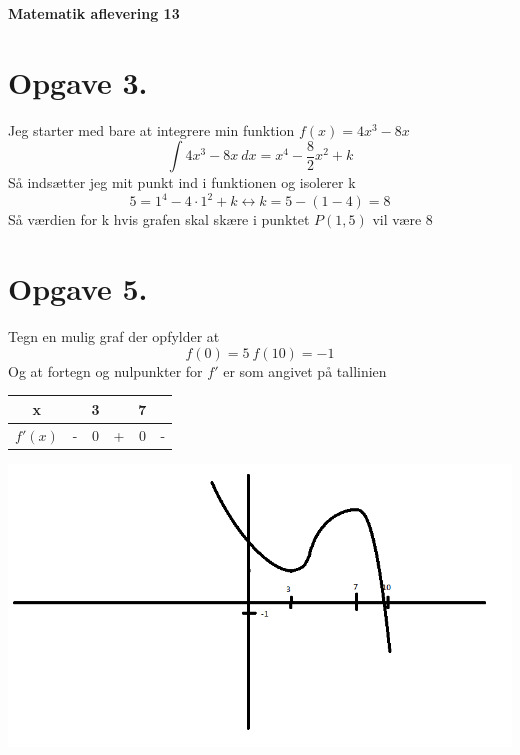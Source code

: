 \documentclass[12pt]{article}
\begin{document}
\Large{\textbf{Matematik aflevering 13}}
\normalsize

\section*{Opgave 3.}
  Jeg starter med bare at integrere min funktion $f(x)=4x^3-8x$
  $$\int 4x^3-8x \ dx = x^4-\frac{8}{2}x^2+k$$
  Så indsætter jeg mit punkt ind i funktionen og isolerer k
  $$5=1^4-4 \cdot 1^2+k \leftrightarrow k=5-(1-4)=8$$
  Så værdien for k hvis grafen skal skære i punktet $P(1,5)$ vil være $8$

\section*{Opgave 5.}
  Tegn en mulig graf der opfylder at
  $$f(0)=5 \ f(10)=-1$$
  Og at fortegn og nulpunkter for $f'$ er som angivet på tallinien
  \begin{center}
    \begin{tabular}{c c c c c c}
      x && 3 && 7 &\\
      \hline
      $f'(x)$ & - & 0 & + & 0 & -
    \end{tabular}
  \end{center}
  \includegraphics[width=\textwidth]{Graf1mat13.png}
\end{document}
